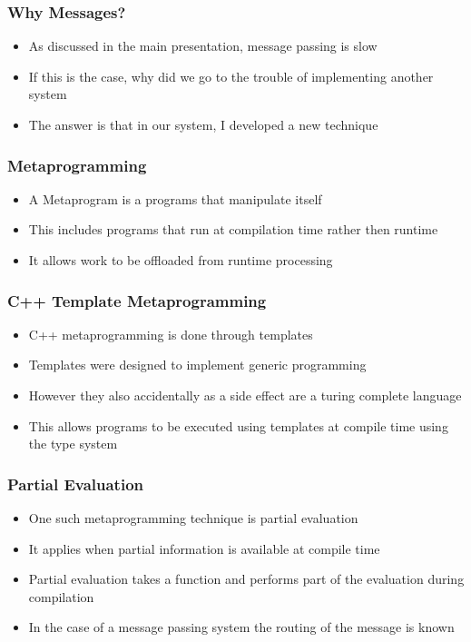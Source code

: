 \documentclass{beamer}
\begin{document}
	\begin{frame}
		\frametitle{Why Messages?}
		\begin{itemize}
			\item As discussed in the main presentation, message passing is slow
			\item If this is the case, why did we go to the trouble of implementing another system
			\item The answer is that in our system, I developed a new technique
		\end{itemize}
	\end{frame}
	
	\begin{frame}
		\frametitle{Metaprogramming}
		\begin{itemize}
			\item A Metaprogram is a programs that manipulate itself
			\item This includes programs that run at compilation time rather then runtime
			\item It allows work to be offloaded from runtime processing
		\end{itemize}
	\end{frame}
	
	\begin{frame}
		\frametitle{C++ Template Metaprogramming}
		\begin{itemize}
			\item C++ metaprogramming is done through templates
			\item Templates were designed to implement generic programming
			\item However they also accidentally as a side effect are a turing complete language
			\item This allows programs to be executed using templates at compile time using the type system
		\end{itemize}
	\end{frame}
		
	\begin{frame}
		\frametitle{Partial Evaluation}
		\begin{itemize}
			\item One such metaprogramming technique is partial evaluation
			\item It applies when partial information is available at compile time
			\item Partial evaluation takes a function and performs part of the evaluation during compilation
			\item In the case of a message passing system the routing of the message is known
		\end{itemize}
	\end{frame}
	
\end{document}

